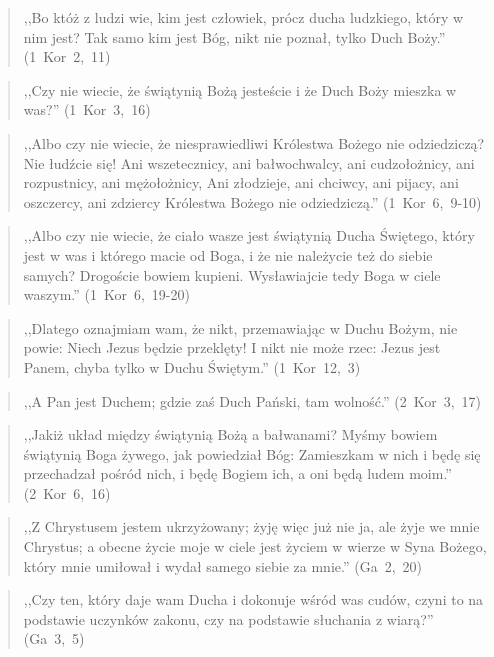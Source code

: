 \documentclass[10pt,a4paper,oneside]{article}
\begin{document}
\begin{quote}
,,Bo któż z ludzi wie, kim jest człowiek, prócz ducha ludzkiego, który w nim jest? Tak samo kim jest Bóg, nikt nie poznał, tylko Duch Boży.'' \mbox{(1 Kor 2, 11)}
\end{quote}
\begin{quote}
,,Czy nie wiecie, że świątynią Bożą jesteście i że Duch Boży mieszka w was?'' \mbox{(1 Kor 3, 16)}
\end{quote}
\begin{quote}
,,Albo czy nie wiecie, że niesprawiedliwi Królestwa Bożego nie odziedziczą? Nie łudźcie się! Ani wszetecznicy, ani bałwochwalcy, ani cudzołożnicy, ani rozpustnicy, ani mężołożnicy, Ani złodzieje, ani chciwcy, ani pijacy, ani oszczercy, ani zdziercy Królestwa Bożego nie odziedziczą.'' \mbox{(1 Kor 6, 9-10)}
\end{quote}
\begin{quote}
,,Albo czy nie wiecie, że ciało wasze jest świątynią Ducha Świętego, który jest w was i którego macie od Boga, i że nie należycie też do siebie samych? Drogoście bowiem kupieni. Wysławiajcie tedy Boga w ciele waszym.'' \mbox{(1 Kor 6, 19-20)}
\end{quote}
\begin{quote}
,,Dlatego oznajmiam wam, że nikt, przemawiając w Duchu Bożym, nie powie: Niech Jezus będzie przeklęty! I nikt nie może rzec: Jezus jest Panem, chyba tylko w Duchu Świętym.'' \mbox{(1 Kor 12, 3)}
\end{quote}
\begin{quote}
,,A Pan jest Duchem; gdzie zaś Duch Pański, tam wolność.'' \mbox{(2 Kor 3, 17)}
\end{quote}
\begin{quote}
,,Jakiż układ między świątynią Bożą a bałwanami? Myśmy bowiem świątynią Boga żywego, jak powiedział Bóg: Zamieszkam w nich i będę się przechadzał pośród nich, i będę Bogiem ich, a oni będą ludem moim.'' \mbox{(2 Kor 6, 16)}
\end{quote}
\begin{quote}
,,Z Chrystusem jestem ukrzyżowany; żyję więc już nie ja, ale żyje we mnie Chrystus; a obecne życie moje w ciele jest życiem w wierze w Syna Bożego, który mnie umiłował i wydał samego siebie za mnie.'' \mbox{(Ga 2, 20)}
\end{quote}
\begin{quote}
,,Czy ten, który daje wam Ducha i dokonuje wśród was cudów, czyni to na podstawie uczynków zakonu, czy na podstawie słuchania z wiarą?'' \mbox{(Ga 3, 5)}
\end{quote}
\end{document}
